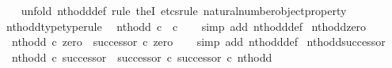 \begin{isabellebody}
%
\isadelimproof
\ \ %
\endisadelimproof
%
\isatagproof
{}\isamarkupfalse%
\ {\isacharparenleft}{\kern0pt}unfold\ nth{\isacharunderscore}{\kern0pt}odd{\isacharunderscore}{\kern0pt}def{\isacharcomma}{\kern0pt}\ rule\ theI{\isacharprime}{\kern0pt}{\isacharcomma}{\kern0pt}\ etcs{\isacharunderscore}{\kern0pt}rule\ natural{\isacharunderscore}{\kern0pt}number{\isacharunderscore}{\kern0pt}object{\isacharunderscore}{\kern0pt}property{}{\isacharparenright}{\kern0pt}%
\endisatagproof
{\isafoldproof}%
%
\isadelimproof
\isanewline
%
\endisadelimproof
\isanewline
{}\isamarkupfalse%
\ nth{\isacharunderscore}{\kern0pt}odd{\isacharunderscore}{\kern0pt}type{\isacharbrackleft}{\kern0pt}type{\isacharunderscore}{\kern0pt}rule{\isacharbrackright}{\kern0pt}{\isacharcolon}{\kern0pt}\isanewline
\ \ {\isachardoublequoteopen}nth{\isacharunderscore}{\kern0pt}odd{\isacharcolon}{\kern0pt}\ {\isasymnat}\isactrlsub c\ {\isasymrightarrow}\ {\isasymnat}\isactrlsub c{\isachardoublequoteclose}\isanewline
%
\isadelimproof
\ \ %
\endisadelimproof
%
\isatagproof
{}\isamarkupfalse%
\ {\isacharparenleft}{\kern0pt}simp\ add{\isacharcolon}{\kern0pt}\ nth{\isacharunderscore}{\kern0pt}odd{\isacharunderscore}{\kern0pt}def{}{\isacharparenright}{\kern0pt}%
\endisatagproof
{\isafoldproof}%
%
\isadelimproof
\isanewline
%
\endisadelimproof
\isanewline
{}\isamarkupfalse%
\ nth{\isacharunderscore}{\kern0pt}odd{\isacharunderscore}{\kern0pt}zero{\isacharcolon}{\kern0pt}\isanewline
\ \ {\isachardoublequoteopen}nth{\isacharunderscore}{\kern0pt}odd\ {\isasymcirc}\isactrlsub c\ zero\ {\isacharequal}{\kern0pt}\ successor\ {\isasymcirc}\isactrlsub c\ zero{\isachardoublequoteclose}\isanewline
%
\isadelimproof
\ \ %
\endisadelimproof
%
\isatagproof
{}\isamarkupfalse%
\ {\isacharparenleft}{\kern0pt}simp\ add{\isacharcolon}{\kern0pt}\ nth{\isacharunderscore}{\kern0pt}odd{\isacharunderscore}{\kern0pt}def{}{\isacharparenright}{\kern0pt}%
\endisatagproof
{\isafoldproof}%
%
\isadelimproof
\isanewline
%
\endisadelimproof
\isanewline
{}\isamarkupfalse%
\ nth{\isacharunderscore}{\kern0pt}odd{\isacharunderscore}{\kern0pt}successor{\isacharcolon}{\kern0pt}\isanewline
\ \ {\isachardoublequoteopen}nth{\isacharunderscore}{\kern0pt}odd\ {\isasymcirc}\isactrlsub c\ successor\ {\isacharequal}{\kern0pt}\ {\isacharparenleft}{\kern0pt}successor\ {\isasymcirc}\isactrlsub c\ successor{\isacharparenright}{\kern0pt}\ {\isasymcirc}\isactrlsub c\ nth{\isacharunderscore}{\kern0pt}odd{\isachardoublequoteclose}\isanewline

\end{isabellebody}
